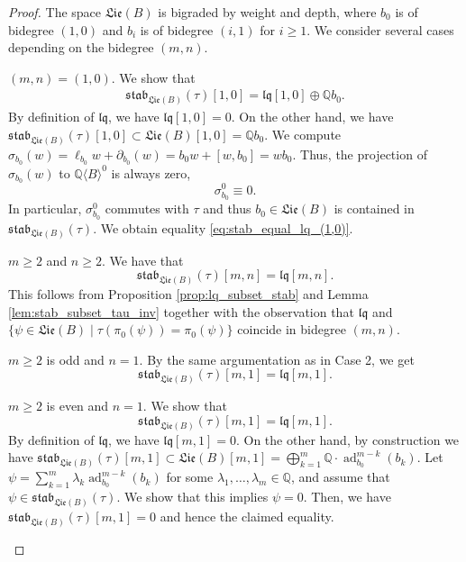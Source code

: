 \documentclass[11pt, a4paper]{amsart}
\numberwithin{equation}{section}
\theoremstyle{definition}
\newcommand{\Q}{\mathbb{Q}}
\newcommand{\QB}{\Q\langle B\rangle}
\newcommand{\lqq}{\mathfrak{lq}}
\newcommand{\ad}{\operatorname{ad}}
\newcommand{\Lie}{\mathfrak{Lie}}
\newcommand{\stab}{\mathfrak{stab}}
\begin{document}
\begin{proof} The space $\Lie(B)$ is bigraded by weight and depth, where $b_0$ is of bidegree $(1,0)$ and $b_i$ is of bidegree $(i,1)$ for $i\geq1$. We consider several cases depending on the bidegree $(m,n)$.

\begin{caselist}
\item $(m,n)=(1,0)$. We show that
\begin{align} \label{eq:stab_equal_lq_(1,0)}
\stab_{\Lie(B)}(\tau)[1,0]=\lqq[1,0]\oplus\Q b_0.
\end{align}
By definition of $\lqq$, we have $\lqq[1,0]=0$. On the other hand, we have $\stab_{\Lie(B)}(\tau)[1,0]\subset \Lie(B)[1,0]=\Q b_0$. We compute $\sigma_{b_0}(w)=\ell_{b_0}w+\partial_{b_0}(w)=b_0w+[w,b_0]=wb_0$. Thus, the projection of $\sigma_{b_0}(w)$ to $\QB^0$ is always zero,
\[\sigma_{b_0}^0\equiv 0.\]
In particular, $\sigma_{b_0}^0$ commutes with $\tau$ and thus $b_0\in \Lie(B)$ is contained in $\stab_{\Lie(B)}(\tau)$. We obtain equality \eqref{eq:stab_equal_lq_(1,0)}. 
\item $m\geq 2$ and $n\geq2$. We have that
\[\stab_{\Lie(B)}(\tau)[m,n]=\lqq[m,n].\]
This follows from Proposition \ref{prop:lq_subset_stab} and Lemma \ref{lem:stab_subset_tau_inv} together with the observation that $\lqq$ and $\{\psi\in\Lie(B)\mid \tau(\pi_0(\psi))=\pi_0(\psi)\}$ coincide in bidegree $(m,n)$.
\item $m \geq 2$ is odd and $n=1$. By the same argumentation as in Case 2, we get
\[
\stab_{\Lie(B)}(\tau)[m,1]=\lqq[m,1].
\]
\item $m \geq 2$ is even and $n=1$. We show that
\[
\stab_{\Lie(B)}(\tau)[m,1]=\lqq[m,1].
\]
By definition of $\lqq$, we have $\lqq[m,1]=0$. On the other hand, by construction we have $\stab_{\Lie(B)}(\tau)[m,1]\subset \Lie(B)[m,1]=\bigoplus_{k=1}^m\Q \cdot \ad_{b_0}^{m-k}(b_k)$. Let $\psi=\sum_{k=1}^m \lambda_k \ad_{b_0}^{m-k}(b_k) $ for some $\lambda_1,\ldots,\lambda_m \in \Q$, and assume that $\psi\in \stab_{\Lie(B)}(\tau)$. We show that this implies $\psi=0$. Then, we have $\stab_{\Lie(B)}(\tau)[m,1]=0$ and hence the claimed equality.


\end{caselist}
\end{proof}
\end{document}

